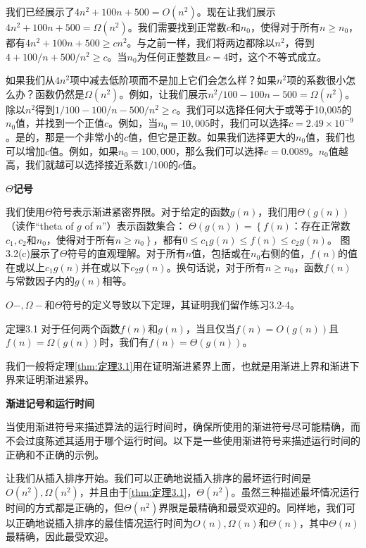\documentclass[lang=cn,newtx,10pt,scheme=chinese]{elegantbook}
\begin{document}
我们已经展示了$4 n^2+100 n+500=O\left(n^2\right)$。现在让我们展示$4 n^2+100 n+500=\Omega\left(n^2\right)$。我们需要找到正常数$c$和$n_0$，使得对于所有$n \geq n_0$，都有$4 n^2+100 n+500 \geq c n^2$。与之前一样，我们将两边都除以$n^2$，得到$4+100 / n+500 / n^2 \geq c$。当$n_0$为任何正整数且$c=4$时，这个不等式成立。

如果我们从$4n^2$项中减去低阶项而不是加上它们会怎么样？如果$n^2$项的系数很小怎么办？函数仍然是$\Omega\left(n^2\right)$。例如，让我们展示$n^2 / 100-100 n-500=\Omega\left(n^2\right)$。除以$n^2$得到$1 / 100-100 / n-500 / n^2 \geq c$。我们可以选择任何大于或等于10,005的$n_0$值，并找到一个正值$c$。例如，当$n_0=10,005$时，我们可以选择$c=2.49 \times 10^{-9}$。是的，那是一个非常小的$c$值，但它是正数。如果我们选择更大的$n_0$值，我们也可以增加$c$值。例如，如果$n_0=100,000$，那么我们可以选择$c=0.0089$。$n_0$值越高，我们就越可以选择接近系数$1 / 100$的$c$值。

\textbf{$\Theta$记号}

我们使用$\Theta$符号表示渐进紧密界限。对于给定的函数$g(n)$，我们用$\Theta(g(n))$（读作“theta of $g$ of $n$”）表示函数集合：
$\Theta(g(n))=\left\{f(n)\right.$：存在正常数$c_1, c_2$和$n_0$，使得对于所有$\left.n \geq n_0\right\}$，都有$0 \leq c_1 g(n) \leq f(n) \leq c_2 g(n)$。
图3.2(c)展示了$\Theta$符号的直观理解。对于所有$n$值，包括或在$n_0$右侧的值，$f(n)$的值在或以上$c_1 g(n)$并在或以下$c_2 g(n)$。换句话说，对于所有$n \geq n_0$，函数$f(n)$与常数因子内的$g(n)$相等。

$O-, \Omega-$和$\Theta$符号的定义导致以下定理，其证明我们留作练习3.2-4。

\begin{theorem}{}{定理3.1}
对于任何两个函数$f(n)$和$g(n)$，当且仅当$f(n)=O(g(n))$且$f(n)=\Omega(g(n))$时，我们有$f(n)=\Theta(g(n))$。
\end{theorem}

我们一般将定理\ref{thm:定理3.1}用在证明渐进紧界上面，也就是用渐进上界和渐进下界来证明渐进紧界。

\textbf{渐进记号和运行时间}

当使用渐进符号来描述算法的运行时间时，确保所使用的渐进符号尽可能精确，而不会过度陈述其适用于哪个运行时间。以下是一些使用渐进符号来描述运行时间的正确和不正确的示例。

让我们从插入排序开始。我们可以正确地说插入排序的最坏运行时间是$O\left(n^2\right), \Omega\left(n^2\right)$，并且由于\ref{thm:定理3.1}，$\Theta\left(n^2\right)$。虽然三种描述最坏情况运行时间的方式都是正确的，但$\Theta\left(n^2\right)$界限是最精确和最受欢迎的。同样地，我们可以正确地说插入排序的最佳情况运行时间为$O(n), \Omega(n)$和$\Theta(n)$，其中$\Theta(n)$最精确，因此最受欢迎。
\end{document}
